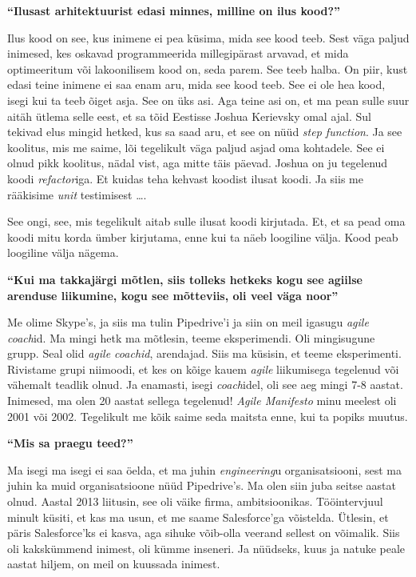 \textbf{\enquote{Ilusast arhitektuurist edasi minnes, milline on ilus kood?}}

Ilus kood on see, kus inimene ei pea küsima, mida see kood teeb. Sest väga
paljud inimesed, kes oskavad programmeerida millegipärast arvavad, et mida
optimeeritum või lakoonilisem kood on, seda parem. See teeb halba. On piir,
kust edasi teine inimene ei saa enam aru, mida see kood teeb. See ei ole hea
kood, isegi kui ta teeb õiget asja. See on üks asi. Aga teine asi on, et ma
pean sulle suur aitäh ütlema selle eest, et sa tõid Eestisse Joshua
Kerievsky omal ajal. Sul tekivad elus mingid hetked, kus sa saad aru,
et see on nüüd \emph{step function}. Ja see koolitus, mis me saime, lõi
tegelikult väga paljud asjad oma kohtadele. See ei olnud pikk koolitus, nädal
vist, aga mitte täis päevad. Joshua on ju tegelenud koodi \emph{refactor}iga.
Et kuidas teha kehvast koodist ilusat koodi. Ja siis me rääkisime \emph{unit}
testimisest \ldots.

See ongi, see, mis tegelikult aitab sulle ilusat koodi kirjutada. Et, et sa
pead oma koodi mitu korda ümber kirjutama, enne kui ta näeb loogiline välja.
Kood peab loogiline välja nägema.

\textbf{\enquote{Kui ma takkajärgi mõtlen, siis tolleks hetkeks kogu see
agiilse arenduse liikumine, kogu see mõtteviis, oli veel väga noor}}

Me olime Skype's, ja siis ma tulin Pipedrive'i ja siin on meil
igasugu \emph{agile coach}id. Ma mingi hetk ma mõtlesin, teeme eksperimendi.
Oli mingisugune grupp. Seal olid \emph{agile coachid}, arendajad. Siis ma
küsisin, et teeme eksperimenti. Rivistame grupi niimoodi, et kes on kõige kauem
\emph{agile} liikumisega tegelenud või vähemalt teadlik olnud. Ja enamasti,
isegi \emph{coach}idel, oli see aeg mingi 7-8 aastat. Inimesed, ma olen 20
aastat sellega tegelenud! \emph{Agile Manifesto} minu meelest oli 2001 või
2002. Tegelikult me kõik saime seda maitsta enne, kui ta popiks muutus.

\textbf{\enquote{Mis sa praegu teed?}}

Ma isegi ma isegi ei saa öelda, et ma juhin \emph{engineering}u
organisatsiooni, sest ma juhin ka muid organisatsioone nüüd
Pipedrive's. Ma olen siin juba seitse aastat olnud. Aastal
2013 liitusin, see oli väike firma, ambitsioonikas. Tööintervjuul minult
küsiti, et kas ma usun, et me saame Salesforce'ga võistelda. Ütlesin, et päris
Salesforce'ks ei kasva, aga sihuke võib-olla veerand sellest on võimalik. Siis
oli kakskümmend inimest, oli kümme inseneri. Ja nüüdseks, kuus ja natuke peale
aastat hiljem, on meil on kuussada inimest.


